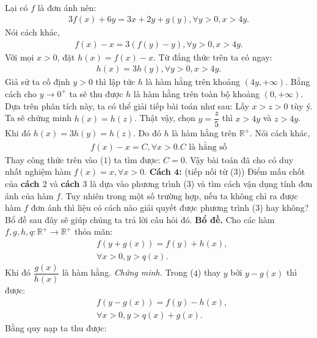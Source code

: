 \begin{multicols}{2}
\begin{align*}
	\end{align*}
	Lại có  $f$ là đơn ánh nên: 
	\begin{align*}
		3f(x) \!+\! 6y \!=\! 3x \!+\! 2y \!+\! g(y),\forall y > 0,x > 4y.
	\end{align*}
	Nói cách khác, 
	\begin{align*}
		f(x) - x = 3(f(y) - y),\forall y > 0,x > 4y.
	\end{align*}
	Với mọi $x > 0$, đặt $h(x) = f(x) - x$. Từ đẳng thức trên ta có ngay: 
	\begin{align*}
		h(x) = 3h(y),\forall y > 0,x > 4y.
	\end{align*}
	Giả sử ta cố định $y > 0$  thì lập tức $h$ là hàm hằng trên khoảng $(4y, + \infty)$. Bằng cách cho $y \to 0^+$  ta sẽ thu được $h$ là hàm hằng trên toàn bộ khoảng $(0 , + \infty)$. Dựa trên phân tích này, ta có thể giải tiếp bài toán như sau:
	\vskip 0.1cm
	Lấy $x > z > 0$  tùy ý. Ta sẽ chứng minh $h(x) = h(z)$.
	\vskip 0.1cm 
	Thật vậy, chọn $y = \dfrac{z}{5}$  thì $x > 4y$  và  $z > 4y$. Khi đó $h(x) = 3h(y) = h(z)$.  Do đó  $h$ là hàm hằng trên $\mathbb{R^+}$. Nói cách khác, 
	\begin{align*}
		f(x) - x = C,\forall x > 0. \text{$C$ là hằng số}
	\end{align*}
	Thay công thức trên vào ($1$) ta tìm được: $C = 0.$
	\vskip 0.1cm 
	Vậy bài toán đã cho có duy nhất nghiệm hàm $f(x) = x, \forall x > 0$.  
	\vskip 0.1cm
	\textbf{\color{hoccungpi}Cách $\pmb4$:} (tiếp nối từ ($3$))
	\vskip 0.1cm     
	Điểm mấu chốt của \textbf{\color{hoccungpi}cách $2$} và \textbf{\color{hoccungpi}cách $3$} là dựa vào phương trình ($3$) và tìm cách vận dụng tính đơn ánh của hàm $f$. Tuy nhiên trong một số trường hợp, nếu ta không chỉ ra được hàm $f$  đơn ánh thì liệu có cách nào giải quyết được phương trình ($3$) hay không? Bổ đề sau đây sẽ giúp chúng ta trả lời câu hỏi đó.  
	\vskip 0.1cm
	\textbf{\color{hoccungpi}Bổ đề.}  Cho các hàm  $f,g,h,q: \mathbb{R^+} \to \mathbb{R^+}$ thỏa mãn: 
	\begin{align*}
		&f(y + g(x)) = f(y) + h(x), \tag{$4$}\\
		&\forall x > 0,y > q(x). 
	\end{align*}
	Khi đó $\dfrac{g(x)}{h(x)}$  là hàm hằng.
	\vskip 0.1cm
	\textit{Chứng minh.}  Trong ($4$) thay $y$ bởi $y - g(x)$  thì được: 
	\begin{align*}
		&f(y - g(x)) = f(y) - h(x),\\
		&\forall x > 0,y > q(x) + g(x).
	\end{align*}
	Bằng quy nạp ta thu được: 

\end{multicols}
